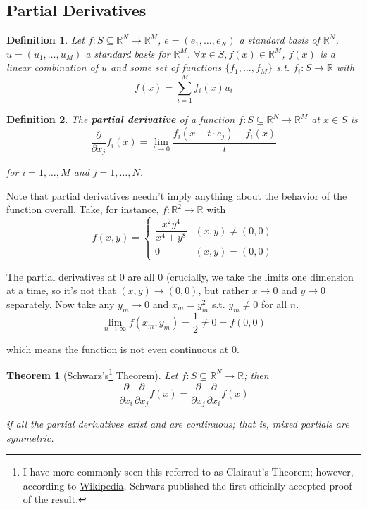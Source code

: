 \documentclass{article}
\newcommand{\keyword}[1]{\textit{\textbf{#1}}\index{#1}}
\theoremstyle{mythm}
\newtheorem{theorem}{Theorem}
\theoremstyle{mydef}
\newtheorem{definition}{Definition}
\begin{document}
\subsection{Partial Derivatives}
\label{ssub:partial_derivatives}

\begin{definition}
  Let $f: S \subseteq \mathbb{R}^N \to \mathbb{R}^M$, $e = (e_1, \ldots, e_N)$ a standard basis of $\mathbb{R}^N$, $u = (u_1, \ldots, u_M)$ a standard basis for $\mathbb{R}^M$. $\forall x \in S, f(x) \in \mathbb{R}^M$, $f(x)$ is a linear combination of $u$ and some set of functions $\{f_1, \ldots, f_M\}$ s.t. $f_i: S \to \mathbb{R}$ with
  \[
    f(x) = \sum^{M}_{i = 1} f_i(x) u_i
  \]
\end{definition}

\begin{definition}
  The \keyword{partial derivative} of a function $f: S \subseteq \mathbb{R}^N \to \mathbb{R}^M$ at $x \in S$ is
  \[
    \dfrac{\partial}{\partial x_j} f_i(x) = \lim_{t \to 0} \dfrac{f_i(x + t \cdot e_j) - f_i(x)}{t}
  \]

  for $i = 1, \ldots, M$ and $j = 1, \ldots, N$.
\end{definition}

Note that partial derivatives needn't imply anything about the behavior of the function overall. Take, for instance, $f: \mathbb{R}^2 \to \mathbb{R}$ with
\[
  f(x, y) =
  \begin{cases}
    \dfrac{x^2y^4}{x^4 + y^8} & (x, y) \ne (0, 0) \\
    0 & (x, y) = (0, 0)
  \end{cases}
\]

The partial derivatives at $0$ are all $0$ (crucially, we take the limits one dimension at a time, so it's not that $(x, y) \to (0, 0)$, but rather $x \to 0$ and $y \to 0$ separately. Now take any $y_m \to 0$ and $x_m = y_m^2$ s.t. $y_m \ne 0$ for all $n$.
\[
  \lim_{n \to \infty} f(x_m, y_m) = \dfrac{1}{2} \ne 0 = f(0, 0)
\]

which means the function is not even continuous at $0$.

\begin{theorem}[Schwarz's\footnote{I have more commonly seen this referred to as Clairaut’s Theorem; however, according to \href{https://en.wikipedia.org/wiki/Symmetry_of_second_derivatives}{Wikipedia}, Schwarz published the first officially accepted proof of the result.} Theorem]
  Let $f: S \subseteq \mathbb{R}^N \to \mathbb{R}$; then
  \[
    \dfrac{\partial}{\partial x_i} \dfrac{\partial}{\partial x_j} f(x)
    =
    \dfrac{\partial}{\partial x_j} \dfrac{\partial}{\partial x_i} f(x)
  \]

  if all the partial derivatives exist and are continuous; that is, mixed partials are symmetric.
\end{theorem}
\end{document}
